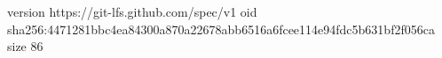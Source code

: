 version https://git-lfs.github.com/spec/v1
oid sha256:4471281bbc4ea84300a870a22678abb6516a6fcee114e94fdc5b631bf2f056ca
size 86
